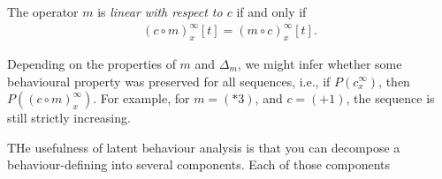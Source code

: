 \begin{definition}
The operator $m$ is \emph{linear with respect to $c$} if and only if
\begin{align}
    (c\circ m)^\infty_x[t]= (m \circ c)^\infty_x[t].
\end{align}    
\end{definition}


Depending on the properties of $m$ and $\Delta_m$, we might infer whether some behavioural property was preserved for all sequences, i.e., if $P(c^\infty_x)$, then $P((c\circ m)^\infty_x)$. For example, for $m=(*3)$, and $c=(+1)$, the sequence is still strictly increasing. 











THe usefulness of latent behaviour analysis is that you can decompose a behaviour-defining into several components. Each of those components 



